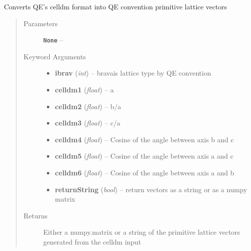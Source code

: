 \documentclass[letterpaper,10pt,english]{sphinxmanual}
\begin{document}
\begin{fulllineitems}
\label{retr:retr.celldm2free}
Converts  QE's celldm format into QE convention primitive lattice vectors
\begin{quote}\begin{description}
\item[{Parameters}] \leavevmode
\textbf{\texttt{None}} -- 

\item[{Keyword Arguments}] \leavevmode\begin{itemize}
\item {} 
\textbf{ibrav} (\emph{int}) --
bravais lattice type by QE convention

\item {} 
\textbf{celldm1} (\emph{float}) --
a

\item {} 
\textbf{celldm2} (\emph{float}) --
b/a

\item {} 
\textbf{celldm3} (\emph{float}) --
c/a

\item {} 
\textbf{celldm4} (\emph{float}) --
Cosine of the angle between axis b and c

\item {} 
\textbf{celldm5} (\emph{float}) --
Cosine of the angle between axis a and c

\item {} 
\textbf{celldm6} (\emph{float}) --
Cosine of the angle between axis a and b

\item {} 
\textbf{returnString} (\emph{bool}) --
return vectors as a string or as a numpy matrix

\end{itemize}

\item[{Returns}] \leavevmode
Either a numpy.matrix or a string of the primitive lattice vectors generated from the celldm input

\end{description}\end{quote}

\end{fulllineitems}

\end{document}
